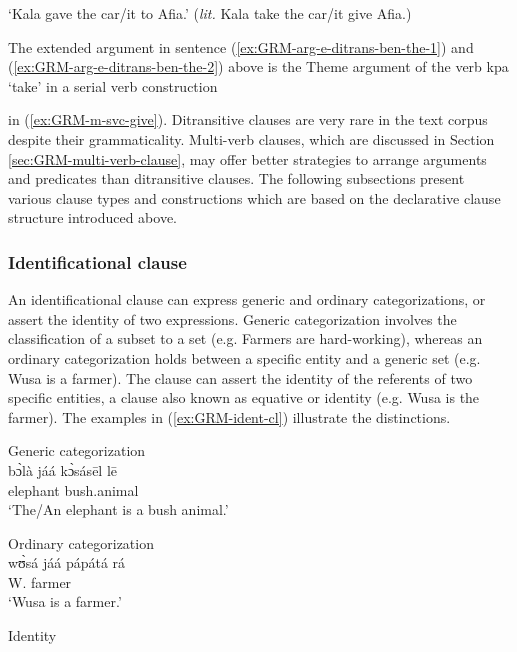 \glt  `Kala gave  the car/it to Afia.' ({\it lit.} Kala take the car/it give
Afia.)
\z

The extended argument in sentence (\ref{ex:GRM-arg-e-ditrans-ben-the-1})  and
(\ref{ex:GRM-arg-e-ditrans-ben-the-2})  above  is the Theme argument 
of the verb
{\sls kpa} `take'   in a serial verb construction  
 
in
(\ref{ex:GRM-m-svc-give}).   Ditransitive clauses are
very rare in the text corpus despite their grammaticality.  Multi-verb
clauses, which are discussed in Section \ref{sec:GRM-multi-verb-clause},
may offer  better strategies to arrange arguments and predicates than
ditransitive clauses. The following subsections present various clause types and
constructions which are based on the declarative clause structure introduced
above.  





\subsubsection{Identificational clause}
\label{sec:GRM-ident-cl}


An identificational clause can express generic and ordinary categorizations, or
assert the identity  of two expressions. Generic categorization involves the 
classification of a subset to a set (e.g. Farmers are hard-working),
whereas an ordinary categorization holds between a specific entity and a generic
set  (e.g.  Wusa is a farmer). The clause can assert the identity of the
referents of two specific entities, a clause also known as equative or identity
(e.g. Wusa is the farmer). The examples in
(\ref{ex:GRM-ident-cl}) illustrate the
distinctions. 

\ea\label{ex:GRM-ident-cl}

\ea\label{ex:GRM-ident-gen-cat}{\rm Generic categorization}\\
\gll
 bɔ̀là jáá kɔ̀sásēl lē\\
 elephant {\ident}  bush.animal {\foc}\\
\glt `The/An elephant is a bush animal.'

\ex\label{ex:GRM-ident-ord-cat}{\rm Ordinary categorization}\\
\gll
wʊ̀sá jáá pápátá rá\\
W. {\ident} farmer {\foc}\\
\glt `Wusa is a farmer.'

\ex\label{ex:GRM-ident-tk-id}{\rm Identity}\\

